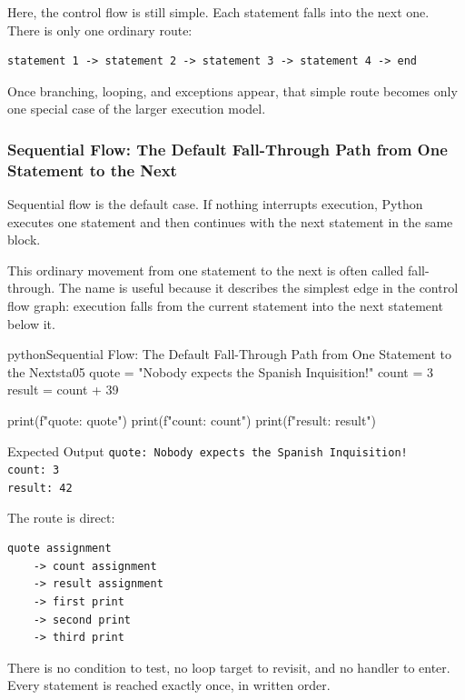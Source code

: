 Here, the control flow is still simple. Each statement falls into the next one. There is only one ordinary route:

\begin{verbatim}
statement 1 -> statement 2 -> statement 3 -> statement 4 -> end
\end{verbatim}

Once branching, looping, and exceptions appear, that simple route becomes only one special case of the larger execution model.

\subsubsection{Sequential Flow: The Default Fall-Through Path from One Statement to the Next}

Sequential flow is the default case. If nothing interrupts execution, Python executes one statement and then continues with the next statement in the same block.

This ordinary movement from one statement to the next is often called fall-through. The name is useful because it describes the simplest edge in the control flow graph: execution falls from the current statement into the next statement below it.

\begin{codebox}[]{python}{Sequential Flow: The Default Fall-Through Path from One Statement to the Next}{sta05}
quote = "Nobody expects the Spanish Inquisition!"
count = 3
result = count + 39

print(f"quote: {quote}")
print(f"count: {count}")
print(f"result: {result}")
\end{codebox}


\begin{iobox}{Expected Output}
\texttt{quote: Nobody expects the Spanish Inquisition!} \\
\texttt{count: 3} \\
\texttt{result: 42} \\
\end{iobox}


The route is direct:

\begin{verbatim}
quote assignment
    -> count assignment
    -> result assignment
    -> first print
    -> second print
    -> third print
\end{verbatim}

There is no condition to test, no loop target to revisit, and no handler to enter. Every statement is reached exactly once, in written order.

